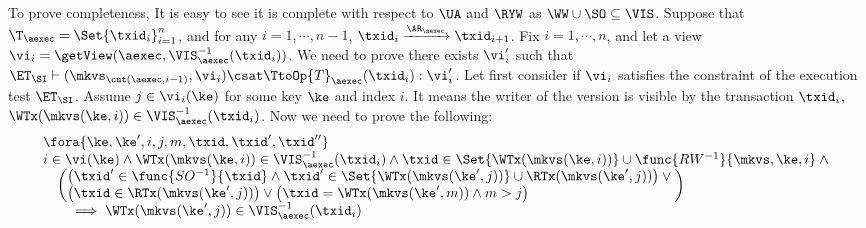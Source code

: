 To prove completeness, 
It is easy to see it is complete with respect to \( \UA \) and \( \RYW \) as \( \WW \cup \SO \subseteq \VIS \).
Suppose that $\T_{\aexec} = \Set{\txid_{i}}_{i=1}^{n}$, and for any $i=1,\cdots, n-1$,
$\txid_{i} \xrightarrow{\AR_{\aexec}} \txid_{i+1}$.
Fix $i=1,\cdots,n$, and let a view $\vi_{i} = \getView(\aexec, \VIS^{-1}_{\aexec}(\txid_{i}))$.
We need to prove there exists \( \vi'_i \) such that 
\( \ET_\SI \vdash ( \mkvs_{\cut(\aexec, i-1)}, \vi_i ) \csat \TtoOp{T}_{\aexec}(\txid_{i}) : \vi'_{i} \).
Let first consider if \( \vi_i \) satisfies the constraint of the execution test \( \ET_\SI \).
Assume \( j \in \vi_i(\ke) \) for some key \(\ke \) and index \( i \).
It means the writer  of the version is visible by the transaction \( \txid_i\),
\ie \( \WTx(\mkvs(\ke,i)) \in \VIS^{-1}_{\aexec}(\txid_{i}) \).
Now we need to prove the following:
\begin{gather}
    \label{equ:si-complete-arvis}
    \begin{array}{@{}l@{}}
        \fora{\ke, \ke', i, j, m, \txid, \txid', \txid''} \\
        \begin{array}{@{}l@{}}
        i \in \vi(\ke) 
        \land \WTx(\mkvs(\ke,i)) \in \VIS^{-1}_{\aexec}(\txid_{i}) 
        \land \txid \in \Set{\WTx(\mkvs(\ke,i))} \cup \func{RW^{-1}}{\mkvs, \ke, i} \land {} \\
            \quad \left(
                \begin{array}{@{}l @{}}
                    \left( \begin{array}{@{}l@{}}
                        \txid' \in \func{SO^{-1}}{\txid}
                        \land \txid' \in \Set{\WTx(\mkvs(\ke',j))} \cup  \RTx(\mkvs(\ke',j))
                    \end{array} \right)  \lor {} \\
                    \left( \begin{array}{@{}l@{}}
                        \txid \in \RTx(\mkvs(\ke',j)) 
                    \end{array} \right) \lor 
                    \left( \begin{array}{@{}l@{}}
                        \txid = \WTx(\mkvs(\ke',m)) 
                        \land m > j
                    \end{array} \right) 
                \end{array}
                \right)  \\
        \qquad \implies \WTx(\mkvs(\ke',j)) \in \VIS^{-1}_{\aexec}(\txid_{i})
        \end{array} 
    \end{array} 
\end{gather}
